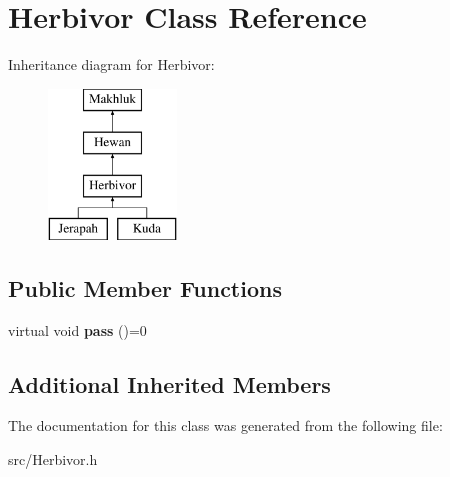 \hypertarget{class_herbivor}{}\section{Herbivor Class Reference}
\label{class_herbivor}
Inheritance diagram for Herbivor\+:\begin{figure}[H]
\begin{center}
\leavevmode
\includegraphics[height=4.000000cm]{class_herbivor}
\end{center}
\end{figure}
\subsection*{Public Member Functions}
\begin{DoxyCompactItemize}
\item 
\hypertarget{class_herbivor_a0566325e084c521e29d3b1ada88db6e8}{}virtual void {\bfseries pass} ()=0\label{class_herbivor_a0566325e084c521e29d3b1ada88db6e8}

\end{DoxyCompactItemize}
\subsection*{Additional Inherited Members}


The documentation for this class was generated from the following file\+:\begin{DoxyCompactItemize}
\item 
src/Herbivor.\+h\end{DoxyCompactItemize}

